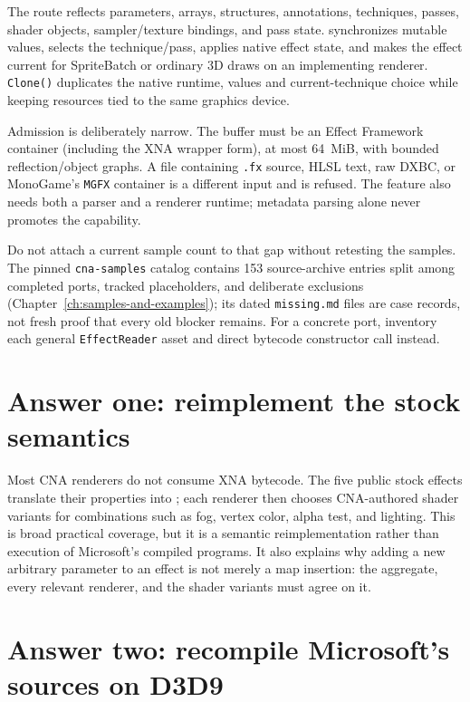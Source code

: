 The route reflects parameters, arrays, structures, annotations, techniques, passes, shader
objects, sampler/texture bindings, and pass state.  synchronizes
mutable values, selects the technique/pass, applies native effect state, and makes the effect
current for SpriteBatch or ordinary 3D draws on an implementing renderer. \texttt{Clone()}
duplicates the native runtime, values and current-technique choice while keeping resources tied
to the same graphics device.

Admission is deliberately narrow. The buffer must be an Effect Framework container (including
the XNA wrapper form), at most 64~MiB, with bounded reflection/object graphs. A file containing
\texttt{.fx} source, HLSL text, raw DXBC, or MonoGame's \texttt{MGFX} container is a different
input and is refused. The feature also needs both a parser and a renderer runtime; metadata
parsing alone never promotes the capability.

Do not attach a current sample count to that gap without retesting the samples.  The pinned
\texttt{cna-samples} catalog contains 153 source-archive entries split among completed ports,
tracked placeholders, and deliberate exclusions (Chapter~\ref{ch:samples-and-examples}); its
dated \texttt{missing.md} files are case records, not fresh proof that every old blocker remains.
For a concrete port, inventory each general \texttt{EffectReader} asset and direct bytecode
constructor call instead.

\section{Answer one: reimplement the stock semantics}

Most CNA renderers do not consume XNA bytecode.  The five public stock effects translate their
properties into ; each renderer then chooses CNA-authored shader variants
for combinations such as fog, vertex color, alpha test, and lighting.  This is broad practical
coverage, but it is a semantic reimplementation rather than execution of Microsoft's compiled
programs.  It also explains why adding a new arbitrary parameter to an effect is not merely a
map insertion: the aggregate, every relevant renderer, and the shader variants must agree on it.

\section{Answer two: recompile Microsoft's sources on D3D9}

